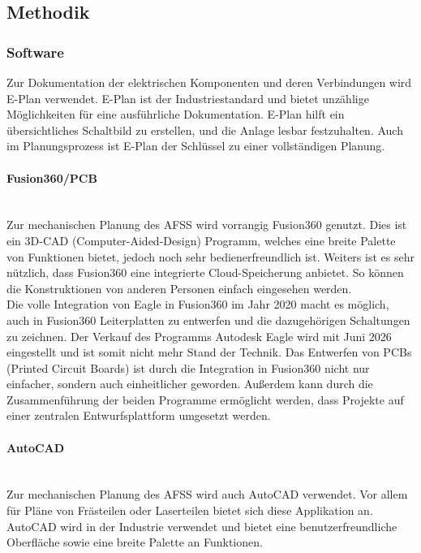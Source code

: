 \subsection{Methodik}

\subsubsection{Software}

Zur Dokumentation der elektrischen Komponenten und deren Verbindungen wird E-Plan verwendet. E-Plan ist der Industriestandard und bietet unzählige Möglichkeiten für eine ausführliche Dokumentation. E-Plan hilft ein übersichtliches Schaltbild zu erstellen, und die Anlage lesbar festzuhalten. Auch im Planungsprozess ist E-Plan der Schlüssel zu einer vollständigen Planung.

\paragraph{Fusion360/PCB}\mbox{}\\
Zur mechanischen Planung des AFSS wird vorrangig Fusion360 genutzt. Dies ist ein 3D-CAD (Computer-Aided-Design) Programm, welches eine breite Palette von Funktionen bietet, jedoch noch sehr bedienerfreundlich ist. Weiters ist es sehr nützlich, dass Fusion360 eine integrierte Cloud-Speicherung anbietet. So können die Konstruktionen von anderen Personen einfach eingesehen werden.\\

Die volle Integration von Eagle in Fusion360 im Jahr 2020 macht es möglich, auch in Fusion360 Leiterplatten zu entwerfen und die dazugehörigen Schaltungen zu zeichnen. Der Verkauf des Programms Autodesk Eagle wird mit Juni 2026 eingestellt und ist somit nicht mehr Stand der Technik.\cite{Eagle_in_Fusion} Das Entwerfen von PCBs (Printed Circuit Boards) ist durch die Integration in Fusion360 nicht nur einfacher, sondern auch einheitlicher geworden. Außerdem kann durch die Zusammenführung der beiden Programme ermöglicht werden, dass Projekte auf einer zentralen Entwurfsplattform umgesetzt werden.

\paragraph{AutoCAD}\mbox{}\\
Zur mechanischen Planung des AFSS wird auch AutoCAD verwendet. Vor allem für Pläne von Frästeilen oder Laserteilen bietet sich diese Applikation an. AutoCAD wird in der Industrie verwendet und bietet eine benutzerfreundliche Oberfläche sowie eine breite Palette an Funktionen.


